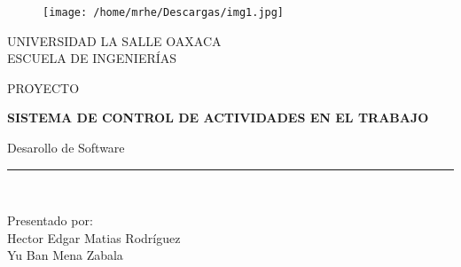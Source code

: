 \documentclass[11pt,a4paper]{article}
\author{Ambos}
\title{}
\date{12 de agosto del 2017}
\begin{document}
\begin{titlepage}
\begin{center}
\vspace*{-1in}
\begin{figure}[htb]
\begin{center}
\texttt{[image: /home/mrhe/Descargas/img1.jpg]}
\end{center}
\end{figure}

UNIVERSIDAD LA SALLE OAXACA\\
\vspace*{0.15in}
ESCUELA DE INGENIERÍAS \\
\vspace*{0.6in}
\begin{large}
PROYECTO\\
\end{large}
\vspace*{0.2in}
\begin{Large}
\textbf{SISTEMA DE CONTROL DE ACTIVIDADES EN EL TRABAJO} \\
\end{Large}
\vspace*{0.3in}
\begin{large}
Desarollo de Software\\
\end{large}
\vspace*{0.3in}
\rule{80mm}{0.1mm}\\
\vspace*{0.1in}
\begin{large}
Presentado por: \\ 

Hector Edgar Matias Rodríguez \\
Yu Ban Mena Zabala \\
\end{large}
\end{center}

\end{titlepage}


\tableofcontents %

\cleardoublepage

\end{document}
